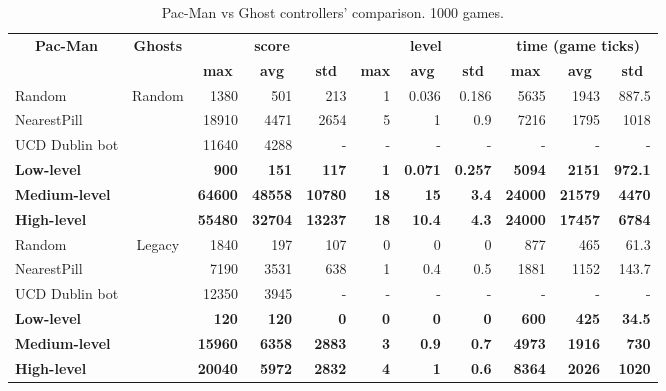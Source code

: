 \begin{sidewaystable}[h]
\centering
\begin{tabular}{|l|c|r|r|r|r|r|r|r|r|r|}
\hline
\multicolumn{1}{|c|}{\multirow{2}{*}{\textbf{Pac-Man}}} & \multirow{2}{*}{\textbf{Ghosts}} & \multicolumn{3}{c|}{\textbf{score}} & \multicolumn{3}{c|}{\textbf{level}} & \multicolumn{3}{c|}{\textbf{time (game ticks)}} \\ \cline{3-11} 
\multicolumn{1}{|c|}{} &  & \multicolumn{1}{c|}{\textbf{max}} & \multicolumn{1}{c|}{\textbf{avg}} & \multicolumn{1}{c|}{\textbf{std}} & \multicolumn{1}{c|}{\textbf{max}} & \multicolumn{1}{c|}{\textbf{avg}} & \multicolumn{1}{c|}{\textbf{std}} & \multicolumn{1}{c|}{\textbf{max}} & \multicolumn{1}{c|}{\textbf{avg}} & \multicolumn{1}{c|}{\textbf{std}} \\ \hline
Random &  \multirow{5}{*}{Random} & 1380 & 501 & 213 & 1 & 0.036 & 0.186 & 5635 & 1943 & 887.5 \\ \cline{1-1} \cline{3-11} 
NearestPill &  & 18910 & 4471 & 2654 & 5 & 1 & 0.9 & 7216 & 1795 & 1018 \\ \cline{1-1} \cline{3-11} 
UCD Dublin bot \cite{galvan2010evolving} &  & 11640 & 4288 & - & - & - & - & - & - & - \\ \cline{1-1} \cline{3-11} 
\textbf{Low-level} &  & \textbf{900} & \textbf{151} & \textbf{117} & \textbf{1} & \textbf{0.071} & \textbf{0.257} & \textbf{5094} & \textbf{2151} & \textbf{972.1} \\ \cline{1-1} \cline{3-11} 
\textbf{Medium-level} &  & \textbf{64600} & \textbf{48558} & \textbf{10780} & \textbf{18} & \textbf{15} & \textbf{3.4} & \textbf{24000} & \textbf{21579} & \textbf{4470} \\ \cline{1-1} \cline{3-11} 
\textbf{High-level} &  & \textbf{55480} & \textbf{32704} & \textbf{13237} & \textbf{18} & \textbf{10.4} & \textbf{4.3} & \textbf{24000} & \textbf{17457} & \textbf{6784} \\ \hline
Random & \multirow{5}{*}{Legacy} & 1840 & 197 & 107 & 0 & 0 & 0 & 877 & 465 & 61.3 \\ \cline{1-1} \cline{3-11} 
NearestPill &  & 7190 & 3531 & 638 & 1 & 0.4 & 0.5 & 1881 & 1152 & 143.7 \\ \cline{1-1} \cline{3-11} 
UCD Dublin bot \cite{galvan2010evolving} &  & 12350 & 3945 & - & - & - & - & - & - & - \\ \cline{1-1} \cline{3-11} 
\textbf{Low-level} &  & \textbf{120} & \textbf{120} & \textbf{0} & \textbf{0} & \textbf{0} & \textbf{0} & \textbf{600} & \textbf{425} & \textbf{34.5} \\ \cline{1-1} \cline{3-11} 
\textbf{Medium-level} &  & \textbf{15960} & \textbf{6358} & \textbf{2883} & \textbf{3} & \textbf{0.9} & \textbf{0.7} & \textbf{4973} & \textbf{1916} & \textbf{730} \\ \cline{1-1} \cline{3-11} 
\textbf{High-level} &  & \textbf{20040} & \textbf{5972} & \textbf{2832} & \textbf{4} & \textbf{1} & \textbf{0.6} & \textbf{8364} & \textbf{2026} & \textbf{1020} \\ \hline
\end{tabular}
\caption{Pac-Man vs Ghost controllers' comparison. 1000 games.}
\label{table:single_obj}
\end{sidewaystable}

